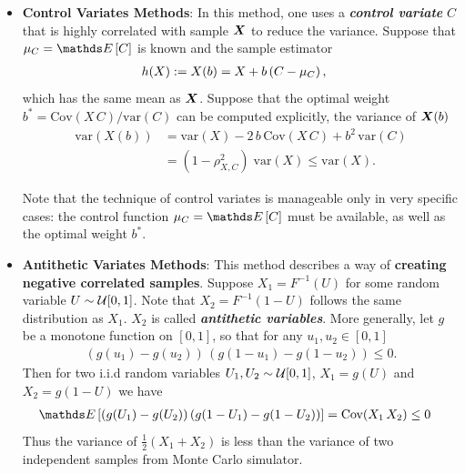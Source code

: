 \documentclass[11pt]{article}
\begin{document}
\begin{itemize}
\item \textbf{Control Variates Methods}: In this method, one uses a \emph{\textbf{control variate}} $C$ that is highly correlated with sample $\boldsymbol{X}$ to reduce the variance. Suppose that $\mu_{C} = \E{}{C}$ is known and the sample estimator
\begin{align*}
h(X):= X(b) &= X + b\left(C - \mu_{C}\right),
\end{align*} which has the same mean as $\boldsymbol{X}$. Suppose that the optimal weight $b^{*} = \text{Cov}(X\,C)/\text{var}(C)$ can be computed explicitly, the variance of $\boldsymbol{X}(b)$
\begin{align*}
\text{var}(X(b)) &= \text{var}(X) - 2\,b\,\text{Cov}(X\,C) +  b^2 \,\text{var}(C)\\
&= (1- \rho_{X,C}^2)\;\text{var}(X) \le \text{var}(X).
\end{align*}

Note that the technique of control variates is manageable only in very specific cases: the control function $\mu_{C} = \E{}{C}$ must be available, as well as the optimal weight $b^{*}$.

\item \textbf{Antithetic Variates Methods}: This method describes a way of \textbf{creating negative correlated samples}. Suppose $X_1 = F^{-1}(U)$ for some random variable $U \sim {\mathcal U}[0,1]$. Note that $X_2 = F^{-1}(1- U)$ follows the same distribution as $X_1$. $X_2$ is called \textbf{\emph{antithetic variables}}. More generally, let $g$ be a monotone function on $[0,1]$, so that for any $u_1, u_2 \in [0,1]$
\begin{align*}
(g(u_1) - g(u_2))\,(g(1-u_1) - g(1- u_2)) \le 0. 
\end{align*} Then for two i.i.d random variables $U_1, U_2 \sim {\mathcal U}[0,1]$, $X_1 = g(U)$ and $X_2 = g(1- U)$ we have
\begin{align*}
\E{}{(g(U_1) - g(U_2))\,(g(1-U_1) - g(1- U_2))} &= \text{Cov}(X_1\, X_2) \le 0
\end{align*} Thus the variance of $\frac{1}{2}(X_1 + X_2)$ is less than the variance of two independent samples from Monte Carlo simulator. 
\end{itemize}
\end{document}

